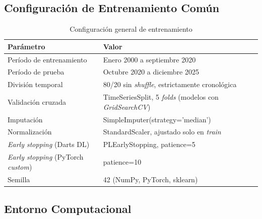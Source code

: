 \subsection{Configuraci\'on de Entrenamiento Com\'un}
\label{app:training_config}

\begin{table}[H]
\centering
\caption{Configuraci\'on general de entrenamiento}
\label{tab:training_common}
\begin{tabular}{@{}lp{10cm}@{}}
\toprule
\textbf{Par\'ametro} & \textbf{Valor} \\
\midrule
Per\'iodo de entrenamiento & Enero 2000 a septiembre 2020 \\
Per\'iodo de prueba & Octubre 2020 a diciembre 2025 \\
Divisi\'on temporal & 80/20 sin \textit{shuffle}, estrictamente cronol\'ogica \\
Validaci\'on cruzada & TimeSeriesSplit, 5 \textit{folds} (modelos con \textit{GridSearchCV}) \\
Imputaci\'on & SimpleImputer(strategy='median') \\
Normalizaci\'on & StandardScaler, ajustado solo en \textit{train} \\
\textit{Early stopping} (Darts DL) & PLEarlyStopping, patience=5 \\
\textit{Early stopping} (PyTorch \textit{custom}) & patience=10 \\
Semilla & 42 (NumPy, PyTorch, sklearn) \\
\bottomrule
\end{tabular}
\end{table}

\subsection{Entorno Computacional}
\label{app:computational_env}

